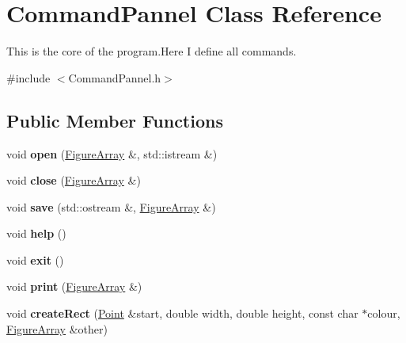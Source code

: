 \hypertarget{class_command_pannel}{}\section{Command\+Pannel Class Reference}
\label{class_command_pannel}


This is the core of the program.\+Here I define all commands.  




{\ttfamily \#include $<$Command\+Pannel.\+h$>$}

\subsection*{Public Member Functions}
\begin{DoxyCompactItemize}
\item 
\mbox{\label{class_command_pannel_adf52e9930fb6d838164d2a49ff3c7cdc}} 
void {\bfseries open} (\mbox{\hyperlink{class_figure_array}{Figure\+Array}} \&, std\+::istream \&)
\item 
\mbox{\label{class_command_pannel_a44a531f45bfd59a8c8dd8c10d3889d20}} 
void {\bfseries close} (\mbox{\hyperlink{class_figure_array}{Figure\+Array}} \&)
\item 
\mbox{\label{class_command_pannel_af3862a0b8f3c252fdd01d9faac351cf5}} 
void {\bfseries save} (std\+::ostream \&, \mbox{\hyperlink{class_figure_array}{Figure\+Array}} \&)
\item 
\mbox{\label{class_command_pannel_ac0330c44bcbc5b61c31210750d644e24}} 
void {\bfseries help} ()
\item 
\mbox{\label{class_command_pannel_ae82a564df4555ffddb10ff53f5e4063b}} 
void {\bfseries exit} ()
\item 
\mbox{\label{class_command_pannel_a007b8f3dfcd45ebb3895e91b122ac7b3}} 
void {\bfseries print} (\mbox{\hyperlink{class_figure_array}{Figure\+Array}} \&)
\item 
\mbox{\label{class_command_pannel_aad4e02ffcc2a78f86f9840b0e893b52e}} 
void {\bfseries create\+Rect} (\mbox{\hyperlink{struct_point}{Point}} \&start, double width, double height, const char $\ast$colour, \mbox{\hyperlink{class_figure_array}{Figure\+Array}} \&other)

\end{DoxyCompactItemize}
